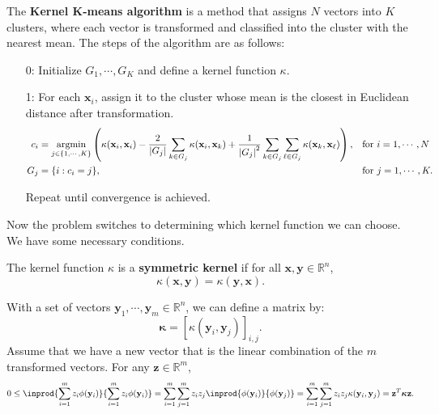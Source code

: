 \documentclass{huhtakm-template-book-v2}
\DeclareMathOperator*{\argmin}{argmin}
\begin{document}
    \begin{defn}
        The \textbf{Kernel K-means algorithm} is a method that assigns $N$ vectors into $K$ clusters, where each vector is transformed and classified into the cluster with the nearest mean. The steps of the algorithm are as follows:
        \begin{itemize}
            \item[0:] Initialize $G_{1},\cdots,G_{K}$ and define a kernel function $\kappa$.
            \item[1:] For each $\mathbf{x}_{i}$, assign it to the cluster whose mean is the closest in Euclidean distance after transformation.
            \begin{align*}
                c_{i}&=\argmin_{j \in \{1, \cdots, K\}} \left(\kappa(\mathbf{x}_{i},\mathbf{x}_{i})-\frac{2}{\abs{G_{j}}}\sum_{k\in G_{j}}\kappa(\mathbf{x}_{i},\mathbf{x}_{k})+\frac{1}{\abs{G_{j}}^{2}}\sum_{k\in G_{j}}\sum_{\ell\in G_{j}}\kappa(\mathbf{x}_{k},\mathbf{x}_{\ell})\right), & &\text{for }i=1,\cdots,N\\
                G_{j}&=\{i:c_{i}=j\}, & &\text{for }j=1,\cdots,K.
            \end{align*}
            \item[] Repeat until convergence is achieved.
        \end{itemize}
    \end{defn}
    Now the problem switches to determining which kernel function we can choose. We have some necessary conditions.
    \begin{defn}
        The kernel function $\kappa$ is a \textbf{symmetric kernel} if for all $\mathbf{x},\mathbf{y}\in\mathbb{R}^{n}$,
        \begin{equation*}
            \kappa(\mathbf{x},\mathbf{y})=\kappa(\mathbf{y},\mathbf{x}).
        \end{equation*}
    \end{defn}
    With a set of vectors $\mathbf{y}_{1},\cdots,\mathbf{y}_{m}\in\mathbb{R}^{n}$, we can define a matrix by:
    \begin{equation*}
        \boldsymbol{\kappa}=[\kappa(\mathbf{y}_{i},\mathbf{y}_{j})]_{i,j}.
    \end{equation*}
    Assume that we have a new vector that is the linear combination of the $m$ transformed vectors. For any $\mathbf{z}\in\mathbb{R}^{m}$,
    \begin{equation*}
        0\leq\inprod{\sum_{i=1}^{m}z_{i}\phi(\mathbf{y}_{i})}{\sum_{i=1}^{m}z_{i}\phi(\mathbf{y}_{i})}=\sum_{i=1}^{m}\sum_{j=1}^{m}z_{i}z_{j}\inprod{\phi(\mathbf{y}_{i})}{\phi(\mathbf{y}_{j})}=\sum_{i=1}^{m}\sum_{j=1}^{m}z_{i}z_{j}\kappa(\mathbf{y}_{i},\mathbf{y}_{j})=\mathbf{z}^{T}\boldsymbol{\kappa}\mathbf{z}.
    \end{equation*}
\end{document}
